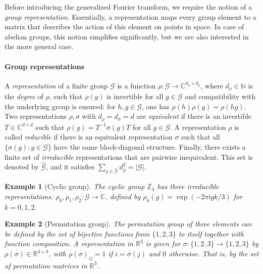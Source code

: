 \documentclass[preprint,12pt,authoryear]{elsarticle}
\newcommand{\Z}{\mathbb Z}
\newcommand{\R}{\mathbb{R}}
\newcommand{\N}{\mathbb{N}}
\newcommand{\C}{\mathbb{C}}
\newcommand{\Fourier}[1]{\widehat{#1}}
\newcommand\Gc{\mathcal G}
\newtheorem{example}{Example}[section]%
\begin{document}
{Before introducing the generalized Fourier transform, we require the notion of a \emph{group representation}. Essentially, a representation maps every group element to a matrix that describes the action of this element on points in space. In case of abelian groups, this notion simplifies significantly, but we are also interested in the more general case.

\paragraph{Group representations}
A \emph{representation} of a finite group $\Gc$ is a function $\rho : \Gc \rightarrow \C^{d_\rho \times d_\rho}$, where $d_\rho \in \N$ is the \emph{degree} of $\rho$, such that $\rho(g)$ is invertible for all $g\in \Gc$ and compatibility with the underlying group is ensured: for $h, g \in \Gc$, one has $\rho(h)\rho(g) = \rho(h g)$. 
Two representations $\rho,\sigma$ with $d_\rho = d_\sigma = d$ are \emph{equivalent} if there is an invertible $T \in \C^{d \times d}$ such that $\rho(g) = T^{-1} \sigma(g) T$ for all $g \in \Gc$.
A representation $\rho$ is called \emph{reducible} if there is an equivalent representation $\sigma$ such that all $\{ \sigma(g) : g \in \Gc\}$ have the same block-diagonal structure.
Finally, there exists a finite set of \emph{irreducible} representations that are pairwise inequivalent. This set is denoted by $\Fourier{\Gc}$, and it satisfies $\sum_{\rho \in \Fourier{\Gc}} d_\rho^2 = |\Gc|$.

\begin{example}[Cyclic group]
    \label{ex:cyclic-group-representation}
    The cyclic group $\Z_3$ has three irreducible representations: $\rho_0,\rho_1,\rho_2 : \Gc \rightarrow \C$, defined by $\rho_k(g) = \exp(-2 \pi \mathrm i g k / 3)$ for $k = 0,1,2$.
\end{example}

\begin{example}[Permutation group]
    The permutation group of three elements can be defined by the set of bijective functions from $\{1,2,3\}$ to itself together with function composition. A representation in $\R^3$ is given for $\sigma : \{1,2,3\} \rightarrow \{1,2,3\}$ by $\rho(\sigma) \in \R^{3 \times 3}$, with $\rho(\sigma)_{ij} = 1$ if $i = \sigma(j)$ and $0$ otherwise. That is, by the set of permutation matrices in $\R^3$.
\end{example}

}
\end{document}
